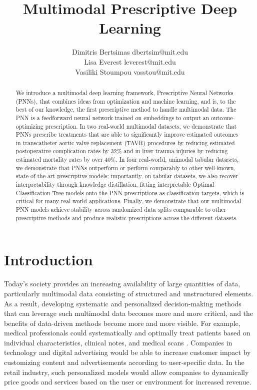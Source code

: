 \documentclass[10pt]{article} %
\title{Multimodal Prescriptive Deep Learning}
\author{\name Dimitris Bertsimas \email dbertsim@mit.edu \\
      \addr {Sloan School of Management and Operations Research Center, Massachusetts Institute of Technology, Cambridge, MA}
      \AND
      \name Lisa Everest \email leverest@mit.edu \\
      \addr {Operations Research Center, Massachusetts Institute of Technology, Cambridge, MA}
      \AND
      \name Vasiliki Stoumpou \email vasstou@mit.edu\\
      \addr {Operations Research Center, Massachusetts Institute of Technology, Cambridge, MA}}
\begin{document}
\maketitle

\begin{abstract}
We introduce a multimodal deep learning framework, Prescriptive Neural Networks (PNNs), that combines ideas from optimization and machine learning, and is, to the best of our knowledge, the first prescriptive method to handle multimodal data. The PNN is a feedforward neural network trained on embeddings to output an outcome-optimizing prescription. In two real-world multimodal datasets, we demonstrate that PNNs prescribe treatments that are able to significantly improve estimated outcomes in transcatheter aortic valve replacement (TAVR) procedures by reducing estimated postoperative complication rates by 32\% and in liver trauma injuries by reducing estimated mortality rates by over 40\%. In four real-world, unimodal tabular datasets, we demonstrate that PNNs outperform or perform comparably to other well-known, state-of-the-art prescriptive models; importantly, on tabular datasets, we also recover interpretability through knowledge distillation, fitting interpretable Optimal Classification Tree models onto the PNN prescriptions as classification targets, which is critical for many real-world applications. Finally, we demonstrate that our multimodal PNN models achieve stability across randomized data splits comparable to other prescriptive methods and produce realistic prescriptions across the different datasets. 
\end{abstract}

\section{Introduction}\label{sec:introduction}

Today's society provides an increasing availability of large quantities of data, particularly multimodal data consisting of structured and unstructured elements. As a result, developing systematic and personalized decision-making methods that can leverage such multimodal data becomes more and more critical, and the benefits of data-driven methods become more and more visible. For example, medical professionals could systematically and optimally treat patients based on individual characteristics, clinical notes, and medical scans \citep{haim}. Companies in technology and digital advertising would be able to increase customer impact by customizing content and advertisements according to user-specific data. In the retail industry, such personalized models would allow companies to dynamically price goods and services based on the user or environment for increased revenue.
\end{document}
